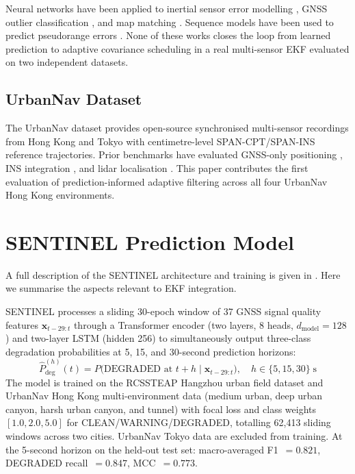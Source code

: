 \documentclass[journal]{IEEEtran}
\newcommand{\Pdeg}{\hat{P}_{\mathrm{deg}}}
\begin{document}
Neural networks have been applied to inertial sensor error modelling
\cite{[AuthorYear_TLIO], [AuthorYear_RIDI]}, GNSS outlier classification
\cite{[AuthorYear_ML_GNSS_outlier]}, and map matching
\cite{[AuthorYear_ML_map_matching]}.  Sequence models have been used to
predict pseudorange errors \cite{[AuthorYear_RNN_pseudorange]}.  None of
these works closes the loop from learned prediction to adaptive covariance
scheduling in a real multi-sensor EKF evaluated on two independent datasets.

\subsection{UrbanNav Dataset}

The UrbanNav dataset \cite{[AuthorYear_UrbanNav_dataset]} provides
open-source synchronised multi-sensor recordings from Hong Kong and Tokyo
with centimetre-level SPAN-CPT/SPAN-INS reference trajectories.  Prior
benchmarks have evaluated GNSS-only positioning \cite{[AuthorYear_UrbanNav_GNSS]},
INS integration \cite{[AuthorYear_UrbanNav_INS]}, and lidar localisation
\cite{[AuthorYear_UrbanNav_lidar]}.  This paper contributes the first
evaluation of prediction-informed adaptive filtering across all four UrbanNav
Hong Kong environments.

\section{SENTINEL Prediction Model}

A full description of the SENTINEL architecture and training is given in
\cite{[AuthorYear_Paper_A_GPS_Solutions]}.  Here we summarise the aspects
relevant to EKF integration.

SENTINEL processes a sliding 30-epoch window of 37 GNSS signal quality
features $\mathbf{x}_{t-29:t}$ through a Transformer encoder (two layers,
8 heads, $d_\text{model}=128$) and two-layer LSTM (hidden 256) to
simultaneously output three-class degradation probabilities at 5, 15, and
30-second prediction horizons:
\begin{equation}
  \Pdeg^{(h)}(t) = P\!\bigl(\text{DEGRADED at }t{+}h
    \mid \mathbf{x}_{t-29:t}\bigr), \quad h \in \{5,15,30\}\;\text{s}
\end{equation}
The model is trained on the RCSSTEAP Hangzhou urban field dataset and
UrbanNav Hong Kong multi-environment data (medium urban, deep urban canyon,
harsh urban canyon, and tunnel) with focal
loss and class weights $[1.0, 2.0, 5.0]$ for CLEAN/WARNING/DEGRADED,
totalling 62,413 sliding windows across two cities.
UrbanNav Tokyo data are excluded from training.
At the 5-second horizon on the held-out test set: macro-averaged
F1~$= 0.821$, DEGRADED recall~$= 0.847$, MCC~$= 0.773$.
\end{document}
